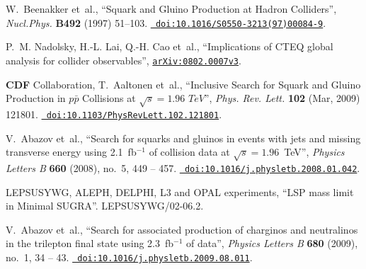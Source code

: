 \begin{thebibliography}{10}
W.~Beenakker {et~al.}, ``Squark and Gluino Production at Hadron Colliders'',
  {\em Nucl.Phys.} {\bf B492} (1997) 51--103.
  \href{http://dx.doi.org/10.1016/S0550-3213(97)00084-9}{{\tt
  doi:10.1016/S0550-3213(97)00084-9}}.

P.~M. Nadolsky, H.-L. Lai, Q.-H. Cao{ et~al.}, ``Implications of CTEQ global
  analysis for collider observables'',
  \href{http://www.arXiv.org/abs/0802.0007v3}{{\tt arXiv:0802.0007v3}}.

{\bf CDF} Collaboration, T.~Aaltonen {et~al.}, ``Inclusive Search for Squark
  and Gluino Production in {$p\bar{p}$} Collisions at $\sqrt{s}=1.96\,\,TeV$'',
  {\em Phys. Rev. Lett.} {\bf 102} (Mar, 2009) 121801.
  \href{http://dx.doi.org/10.1103/PhysRevLett.102.121801}{{\tt
  doi:10.1103/PhysRevLett.102.121801}}.

V.~Abazov {et~al.}, ``Search for squarks and gluinos in events with jets and
  missing transverse energy using 2.1~fb{${}^{-1}$} of collision data at
  {$\sqrt{s}=1.96$}~TeV'', {\em Physics Letters B} {\bf 660} (2008), no.~5, 449
  -- 457. \href{http://dx.doi.org/10.1016/j.physletb.2008.01.042}{{\tt
  doi:10.1016/j.physletb.2008.01.042}}.

{LEPSUSYWG, ALEPH, DELPHI, L3 and OPAL experiments}, ``LSP mass limit in
  Minimal SUGRA''. LEPSUSYWG/02-06.2.

V.~Abazov {et~al.}, ``Search for associated production of charginos and
  neutralinos in the trilepton final state using 2.3~fb{${}^{-1}$} of data'',
  {\em Physics Letters B} {\bf 680} (2009), no.~1, 34 -- 43.
  \href{http://dx.doi.org/10.1016/j.physletb.2009.08.011}{{\tt
  doi:10.1016/j.physletb.2009.08.011}}.

\end{thebibliography}\endgroup
